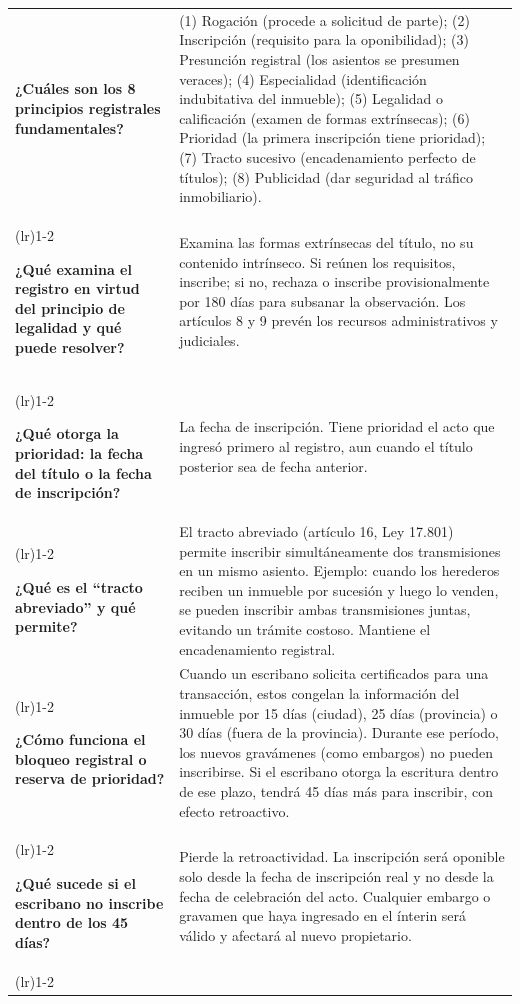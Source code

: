 \documentclass[12pt,oneside]{book}
\begin{document}
\begin{longtable}{>{\RaggedRight\arraybackslash}p{}>{\RaggedRight\arraybackslash}p{}}
\textbf{¿Cuáles son los 8 principios registrales fundamentales?} &
(1) Rogación (procede a solicitud de parte); (2) Inscripción (requisito para la oponibilidad); (3) Presunción registral (los asientos se presumen veraces); (4) Especialidad (identificación indubitativa del inmueble); (5) Legalidad o calificación (examen de formas extrínsecas); (6) Prioridad (la primera inscripción tiene prioridad); (7) Tracto sucesivo (encadenamiento perfecto de títulos); (8) Publicidad (dar seguridad al tráfico inmobiliario). \\
\addlinespace
\cmidrule(lr){1-2}

\textbf{¿Qué examina el registro en virtud del principio de legalidad y qué puede resolver?} &
Examina las formas extrínsecas del título, no su contenido intrínseco. Si reúnen los requisitos, inscribe; si no, rechaza o inscribe provisionalmente por 180 días para subsanar la observación. Los artículos 8 y 9 prevén los recursos administrativos y judiciales. \\
\addlinespace
\cmidrule(lr){1-2}

\textbf{¿Qué otorga la prioridad: la fecha del título o la fecha de inscripción?} &
La fecha de inscripción. Tiene prioridad el acto que ingresó primero al registro, aun cuando el título posterior sea de fecha anterior. \\
\addlinespace
\cmidrule(lr){1-2}

\textbf{¿Qué es el ``tracto abreviado'' y qué permite?} &
El tracto abreviado (artículo 16, Ley 17.801) permite inscribir simultáneamente dos transmisiones en un mismo asiento. Ejemplo: cuando los herederos reciben un inmueble por sucesión y luego lo venden, se pueden inscribir ambas transmisiones juntas, evitando un trámite costoso. Mantiene el encadenamiento registral. \\
\addlinespace
\cmidrule(lr){1-2}

\textbf{¿Cómo funciona el bloqueo registral o reserva de prioridad?} &
Cuando un escribano solicita certificados para una transacción, estos congelan la información del inmueble por 15 días (ciudad), 25 días (provincia) o 30 días (fuera de la provincia). Durante ese período, los nuevos gravámenes (como embargos) no pueden inscribirse. Si el escribano otorga la escritura dentro de ese plazo, tendrá 45 días más para inscribir, con efecto retroactivo. \\
\addlinespace
\cmidrule(lr){1-2}

\textbf{¿Qué sucede si el escribano no inscribe dentro de los 45 días?} &
Pierde la retroactividad. La inscripción será oponible solo desde la fecha de inscripción real y no desde la fecha de celebración del acto. Cualquier embargo o gravamen que haya ingresado en el ínterin será válido y afectará al nuevo propietario. \\
\addlinespace
\cmidrule(lr){1-2}


\end{longtable}
\end{document}
